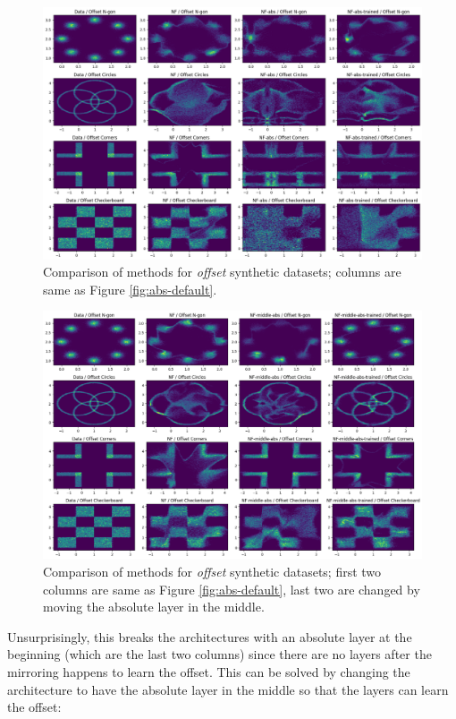 \begin{figure}[p]
    \centering
    \includegraphics[width=.85\linewidth]{images/synthetic/abs-offset.png}
    \caption{Comparison of methods for \textit{offset} synthetic datasets; columns are same as Figure \ref{fig:abs-default}.}
    \label{fig:abs-offset}
\end{figure}

\begin{figure}[p]
    \centering
    \includegraphics[width=.85\linewidth]{images/synthetic/abs-offset-fixed.png}
    \caption{Comparison of methods for \textit{offset} synthetic datasets; first two columns are same as Figure \ref{fig:abs-default}, last two are changed by moving the absolute layer in the middle.}
    \label{fig:abs-offset-fixed}
\end{figure}

Unsurprisingly, this breaks the architectures with an absolute layer at the beginning (which are the last two columns) since there are no layers after the mirroring happens to learn the offset.
This can be solved by changing the architecture to have the absolute layer in the middle so that the layers can learn the offset:


